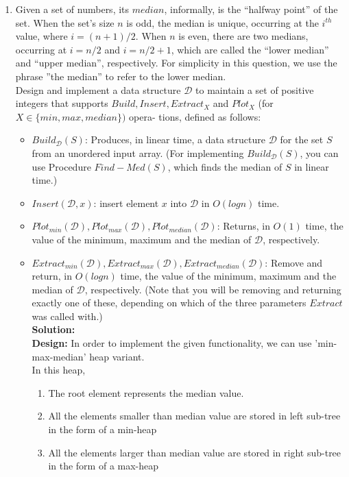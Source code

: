 \documentclass[12pt]{article}
\begin{document}
\begin{enumerate}
\pagebreak
\item Given a set of numbers, its $median$, informally, is the “halfway point” of the set. When the set’s size $n$ is odd, the median is unique, occurring at the $i^{th}$ value, where $i = (n + 1)/2$. When $n$ is even, there are two medians, occurring at $i = n/2$ and $i = n/2 + 1$, which are called the “lower median” and “upper median”, respectively. For simplicity in this question, we use the phrase ”the median” to refer to the lower median.\\
Design and implement a data structure $\mathcal{D}$ to maintain a set of positive integers that supports $Build, Insert, Extract_X$ and $Plot_X$ (for $X \in \{min,max,median\})$ opera- tions, defined as follows:\\
\begin{itemize}
\item  $Build_{\mathcal{D}}(S)$: Produces, in linear time, a data structure $\mathcal{D}$ for the set $S$ from an unordered input array. (For implementing $Build_{\mathcal{D}}(S)$, you can use Procedure $Find − Med(S)$, which finds the median of $S$ in linear time.)
\item $Insert(\mathcal{D}, x)$: insert element $x$ into $\mathcal{D}$ in $O(log n)$ time.
\item $Plot_{min}(\mathcal{D}),Plot_{max}(\mathcal{D}),Plot_{median}(\mathcal{D})$: Returns, in $O(1)$ time, the value of the minimum, maximum and the median of $\mathcal{D}$, respectively.
\item $Extract_{min}(\mathcal{D}), Extract_{max}(\mathcal{D}), Extract_{median}(\mathcal{D})$: Remove and return, in $O(log n)$ time, the value of the minimum, maximum and the median of $\mathcal{D}$, respectively. (Note that you will be removing and returning exactly one of these, depending on which of the three parameters $Extract$ was called with.)\\
\textbf{Solution:} \\
\textbf{Design:} In order to implement the given functionality, we can use 'min-max-median' heap variant.\\
In this heap, 
\begin{enumerate}
\item The root element represents the median value.
\item All the elements smaller than median value are stored in left sub-tree in the form of a min-heap
\item All the elements larger than median value are stored in right sub-tree in the form of a max-heap

\end{enumerate}
\end{itemize}
\end{enumerate}
\end{document}
